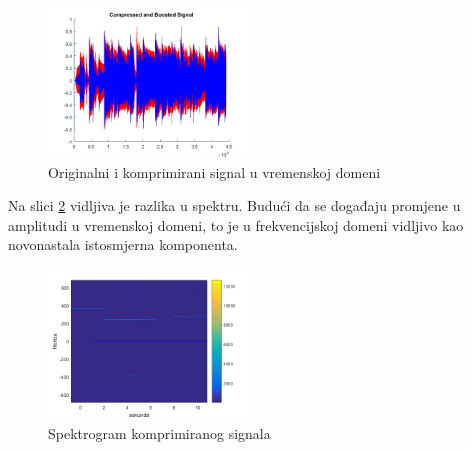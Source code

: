\documentclass[conference]{IEEEtran}
\begin{document}
\begin{figure}[h]
    \includegraphics[width=200]{slike/kompresija_vrijeme.png}
    \centering
    \caption{Originalni i komprimirani signal u vremenskoj domeni}							%
    \label{komp_vrijeme}
\end{figure}

Na slici \ref{komp_spektar} vidljiva je razlika u spektru. Budući da se događaju promjene u amplitudi u
vremenskoj domeni, to je u frekvencijskoj domeni vidljivo kao novonastala istosmjerna komponenta.

\begin{figure}[h]
    \includegraphics[width=200]{slike/kompresija_spektar.png}
    \centering
    \caption{Spektrogram komprimiranog signala}							%
    \label{komp_spektar}
\end{figure}
\end{document}
